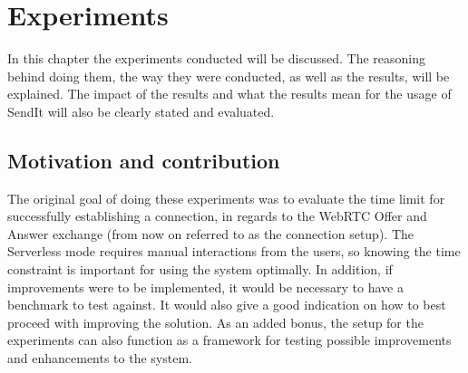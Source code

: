 %
\chapter{Experiments} %
%
\label{Chapter6} %
%
In this chapter the experiments conducted will be discussed. The reasoning behind doing them, the way they were conducted, as well as the results, will be explained. The impact of the results and what the results mean for the usage of SendIt will also be clearly stated and evaluated.
%
\section{Motivation and contribution}
%
The original goal of doing these experiments was to evaluate the time limit for successfully establishing a connection, in regards to the WebRTC Offer and Answer exchange (from now on referred to as the connection setup). The Serverless mode requires manual interactions from the users, so knowing the time constraint is important for using the system optimally. In addition, if improvements were to be implemented, it would be necessary to have a benchmark to test against. It would also give a good indication on how to best proceed with improving the solution. As an added bonus, the setup for the experiments can also function as a framework for testing possible improvements and enhancements to the system.

